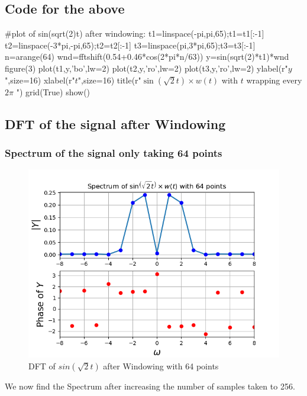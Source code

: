 \documentclass[11pt]{article}
\begin{document}
\subsection{Code for the above}
\begin{python}
#plot of sin(sqrt(2)t) after windowing:
t1=linspace(-pi,pi,65);t1=t1[:-1]
t2=linspace(-3*pi,-pi,65);t2=t2[:-1]
t3=linspace(pi,3*pi,65);t3=t3[:-1]
n=arange(64)
wnd=fftshift(0.54+0.46*cos(2*pi*n/63))
y=sin(sqrt(2)*t1)*wnd
figure(3)
plot(t1,y,'bo',lw=2)
plot(t2,y,'ro',lw=2)
plot(t3,y,'ro',lw=2)
ylabel(r"$y$",size=16)
xlabel(r"$t$",size=16)
title(r"$\sin\left(\sqrt{2}t\right)\times w(t)$ with $t$ wrapping every $2\pi$ ")
grid(True)
show()
\end{python}

\subsection{DFT of the signal after Windowing}
\subsubsection{Spectrum of the signal only taking 64 points}
\begin{figure}[H]
    \centering
    \includegraphics[scale = 0.75]{Figure_4.png}
    \caption{DFT of $sin(\sqrt{2}t)$ after Windowing with 64 points}
\end{figure}

We now find the Spectrum after increasing the number of samples taken to 256.
\end{document}
